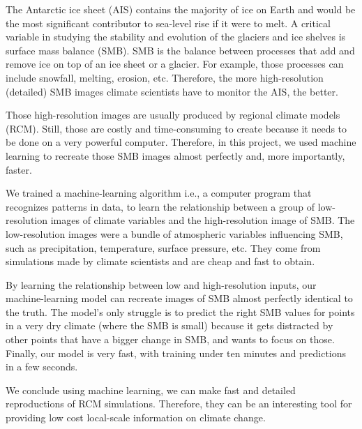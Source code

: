 \documentclass[a4paper,11pt,oneside]{report}
\begin{document}
\begin{plainlanguage}

The Antarctic ice sheet (AIS) contains the majority of ice on Earth and would be the most significant contributor to sea-level rise if it were to melt. A critical variable in studying the stability and evolution of the glaciers and ice shelves is surface mass balance (SMB). SMB is the balance between processes that add and remove ice on top of an ice sheet or a glacier. For example, those processes can include snowfall, melting, erosion, etc. Therefore, the more high-resolution (detailed) SMB  images climate scientists have to monitor the AIS, the better.

Those high-resolution images are usually produced by regional climate models (RCM). Still, those are costly and time-consuming to create because it needs to be done on a very powerful computer. Therefore, in this project, we used machine learning to recreate those SMB images almost perfectly and, more importantly, faster. 

We trained a machine-learning algorithm i.e., a computer program that recognizes patterns in data, to learn the relationship between a group of low-resolution images of climate variables and the high-resolution image of SMB. The low-resolution images were a bundle of atmospheric variables influencing SMB, such as precipitation, temperature, surface pressure, etc. They come from simulations made by climate scientists and are cheap and fast to obtain. 

By learning the relationship between low and high-resolution inputs, our machine-learning model can recreate images of SMB almost perfectly identical to the truth. The model's only struggle is to predict the right SMB values for points in a very dry climate (where the SMB is small) because it gets distracted by other points that have a bigger change in SMB, and wants to focus on those. Finally, our model is very fast, with training under ten minutes and predictions in a few seconds. 

We conclude using machine learning, we can make fast and detailed reproductions of RCM simulations. Therefore, they can be an interesting tool for providing low cost local-scale information on climate change. 


\end{plainlanguage}

\end{document}

